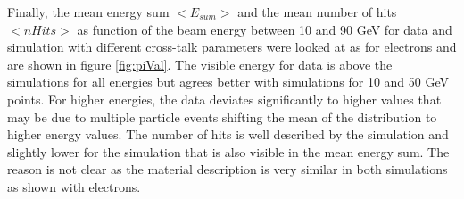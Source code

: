 Finally, the mean energy sum $<E_{sum}>$ and the mean number of hits $<nHits>$ as function of the beam energy between 10 and 90 GeV for data and simulation with different cross-talk parameters were looked at as for electrons and are shown in figure \ref{fig:piVal}. The visible energy for data is above the simulations for all energies but agrees better with simulations for 10 and 50 GeV points. For higher energies, the data deviates significantly to higher values that may be due to multiple particle events shifting the mean of the distribution to higher energy values. The number of hits is well described by the \mokka simulation and slightly lower for the \ddhep simulation that is also visible in the mean energy sum. The reason is not clear as the material description is very similar in both simulations as shown with electrons.

